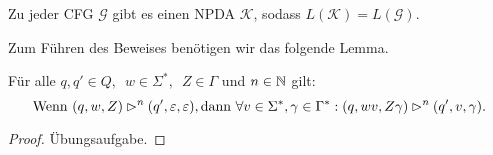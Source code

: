 \begin{lemma}\label{lem:4.cfgToNpda}
 Zu jeder \ac{CFG} $\mathcal{G}$ gibt es einen \ac{NPDA} $\mathcal{K}$, sodass $L(\mathcal{K})=L(\mathcal{G})$.
\end{lemma}

  Zum Führen des Beweises benötigen wir das folgende Lemma.

\begin{lemma}\label{lem:4.mehrKeller}
Für alle $q,q' \in Q,\enspace w \in \Sigma^*,\enspace Z \in \Gamma$ und $n \in \mathbb{N}$ gilt:
  \begin{displaymath}
    \text{Wenn } (q,w,Z) \rhd^n (q', \varepsilon, \varepsilon), \text{dann } \forall v \in \Sigma^*, \gamma \in \Gamma^*: (q, wv, Z\gamma) \rhd^n (q', v, \gamma).
    \qedhere
  \end{displaymath}
\end{lemma}
\begin{proof}
Übungsaufgabe.
\end{proof}


